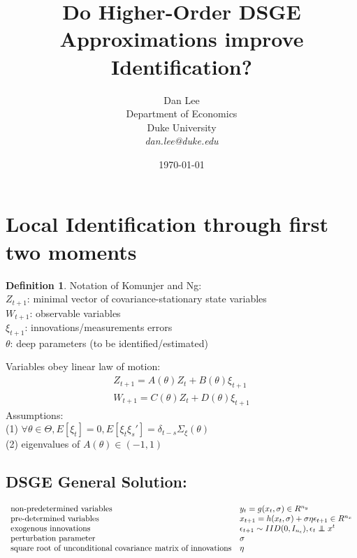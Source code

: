 \documentclass[10pt]{article}
\numberwithin{equation}{section}
\theoremstyle{definition}
\newtheorem{definition}{Definition}[section]
\theoremstyle{remark}
\newcommand\indep{\protect\mathpalette{\protect\independenT}{\perp}}
\def\independenT#1#2{\mathrel{\rlap{$#1#2$}\mkern2mu{#1#2}}}
\begin{document}
\title{Do Higher-Order DSGE Approximations improve Identification?}
\author{Dan Lee\\Department of Economics\\Duke University\\ \textit{dan.lee@duke.edu}}
\date{\today\\}
\maketitle

\section{Local Identification through first two moments}

\begin{definition}{Notation of Komunjer and Ng:}\\
$Z_{t+1}$: minimal vector of covariance-stationary state variables\\
 $W_{t+1}$: observable variables\\
$\xi_{t+1}$: innovations/measurements errors\\
$\theta$: deep parameters (to be identified/estimated)\end{definition}
Variables obey linear law of motion:
\begin{eqnarray}Z_{t+1} = A(\theta ) Z_t + B(\theta )\xi_{t+1}\\
W_{t+1} = C(\theta ) Z_t + D(\theta )\xi_{t+1}\end{eqnarray}
Assumptions:\\
(1) $\forall \theta \in \Theta , E[\xi_t] =0, E[\xi_t\xi_s'] = \delta_{t-s}\Sigma_\xi (\theta)$\\
(2) eigenvalues of $A(\theta ) \in (-1,1)$\\

\subsection{DSGE General Solution:}
\begin{eqnarray}\begin{array}{l l} \text{non-predetermined variables } & y_t = g(x_t,\sigma ) \in R^{n_y}\\
\text{pre-determined variables } & x_{t+1} = h(x_t ,\sigma ) + \sigma \eta \epsilon_{t+1} \in R^{n_x}\\
\text{exogenous innovations } & \epsilon_{t+1} \sim IID(0,I_{n_\epsilon}), \epsilon_t \indep x^t\\
\text{perturbation parameter} & \sigma \\
\text{square root of unconditional covariance matrix of innovations} & \eta \\
 \end{array}\end{eqnarray}\\
\end{document}
